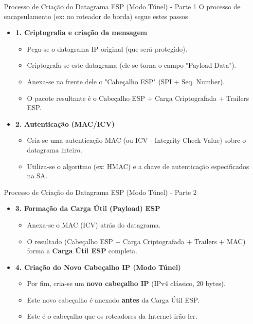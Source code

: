 \begin{frame}{Processo de Criação do Datagrama ESP (Modo Túnel)  - Parte 1}
    O processo de encapsulamento (ex: no roteador de borda) segue estes passos
    \begin{itemize}


        \item \textbf{1. Criptografia e criação da mensagem}
              \begin{itemize}
                  \item Pega-se o datagrama IP original (que será protegido).
                  \item Criptografa-se este datagrama (ele se torna o campo "Payload Data").
                  \item Anexa-se na frente dele o "Cabeçalho ESP" (SPI + Seq. Number).
                  \item O pacote resultante é o Cabeçalho ESP + Carga Criptografada + Trailers ESP.
              \end{itemize}

        \item \textbf{2. Autenticação (MAC/ICV)}
              \begin{itemize}
                  \item Cria-se uma autenticação MAC (ou ICV - Integrity Check Value) sobre o datagrama inteiro.
                  \item Utiliza-se o algoritmo (ex: HMAC) e a chave de autenticação especificados na SA.
              \end{itemize}
    \end{itemize}
\end{frame}
\begin{frame}{Processo de Criação do Datagrama ESP (Modo Túnel) - Parte 2}
    \begin{itemize}

        \item \textbf{3. Formação da Carga Útil (Payload) ESP}
              \begin{itemize}
                  \item Anexa-se o MAC (ICV) atrás do datagrama.
                  \item O resultado (Cabeçalho ESP + Carga Criptografada + Trailers + MAC) forma a \textbf{Carga Útil ESP} completa.
              \end{itemize}

        \item \textbf{4. Criação do Novo Cabeçalho IP (Modo Túnel)}
              \begin{itemize}
                  \item Por fim, cria-se um \textbf{novo cabeçalho IP} (IPv4 clássico, 20 bytes).
                  \item Este novo cabeçalho é anexado \textbf{antes} da Carga Útil ESP.
                  \item Este é o cabeçalho que os roteadores da Internet irão ler.
              \end{itemize}
    \end{itemize}
\end{frame}

